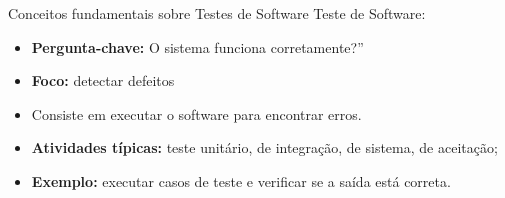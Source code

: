 \begin{frame}{Conceitos fundamentais sobre Testes de Software}
    Teste de Software:
    \begin{itemize}
        \item \textbf{Pergunta-chave:}  O sistema funciona corretamente?”
        \item \textbf{Foco:} detectar defeitos
        \item Consiste em executar o software para encontrar erros.
        \item \textbf{Atividades típicas:} teste unitário, de integração, de sistema, de aceitação;
        \item \textbf{Exemplo:} executar casos de teste e verificar se a saída está correta.
    \end{itemize}
\end{frame}